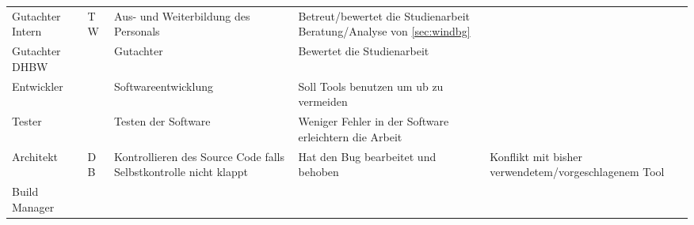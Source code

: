 \begin{tiny}
\begin{longtable}[H]{llL{3cm}L{3cm}L{3cm}}
            \toprule
                        & 
                                           & 
                                                         & 
                                                                      &                                               \\
            \midrule
            \endhead
            Gutachter Intern & 
            T W    & 
            Aus- und Weiterbildung des Personals                             & 
            Betreut/bewertet die Studienarbeit \newline Beratung/Analyse von \ref{sec:windbg} &                                                                \\
            \midrule
            Gutachter DHBW   &                                    
            & 
            Gutachter                                                        & 
            Bewertet die Studienarbeit                                                        &                                                                \\
            \midrule
            Entwickler       &                                    
            & Softwareentwicklung                                              & 
            Soll Tools benutzen um \gls{ub} zu vermeiden                                      &                                                                \\
            \midrule
            Tester           &                                    
            & 
            Testen der Software                                              & 
            Weniger Fehler in der Software erleichtern die Arbeit                             &                                                                \\
            \midrule
            Architekt        & 
            D B   & 
            Kontrollieren des Source Code falls Selbstkontrolle nicht klappt & 
            Hat den Bug bearbeitet und behoben                                                & Konflikt mit bisher verwendetem/vorgeschlagenem Tool           \\
            \midrule
            Build Manager    & 

\end{longtable}
\end{tiny}
